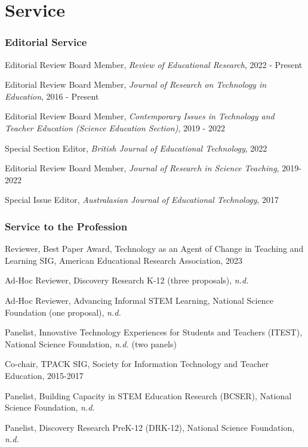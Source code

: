 \documentclass[
  14,
]{article}
\begin{document}
\hypertarget{service}{%
\section{Service}\label{service}}

\hypertarget{editorial-service}{%
\subsubsection{Editorial Service}\label{editorial-service}}

Editorial Review Board Member, \emph{Review of Educational Research},
2022 - Present

Editorial Review Board Member, \emph{Journal of Research on Technology
in Education}, 2016 - Present

Editorial Review Board Member, \emph{Contemporary Issues in Technology
and Teacher Education (Science Education Section)}, 2019 - 2022

Special Section Editor, \emph{British Journal of Educational
Technology}, 2022

Editorial Review Board Member, \emph{Journal of Research in Science
Teaching}, 2019-2022

Special Issue Editor, \emph{Australasian Journal of Educational
Technology}, 2017

\hypertarget{service-to-the-profession}{%
\subsubsection{Service to the
Profession}\label{service-to-the-profession}}

Reviewer, Best Paper Award, Technology as an Agent of Change in Teaching
and Learning SIG, American Educational Research Association, 2023

Ad-Hoc Reviewer, Discovery Research K-12 (three proposals), \emph{n.d.}

Ad-Hoc Reviewer, Advancing Informal STEM Learning, National Science
Foundation (one proposal), \emph{n.d.}

Panelist, Innovative Technology Experiences for Students and Teachers
(ITEST), National Science Foundation, \emph{n.d.} (two panels)

Co-chair, TPACK SIG, Society for Information Technology and Teacher
Education, 2015-2017

Panelist, Building Capacity in STEM Education Research (BCSER), National
Science Foundation, \emph{n.d.}

Panelist, Discovery Research PreK-12 (DRK-12), National Science
Foundation, \emph{n.d.}
\end{document}
